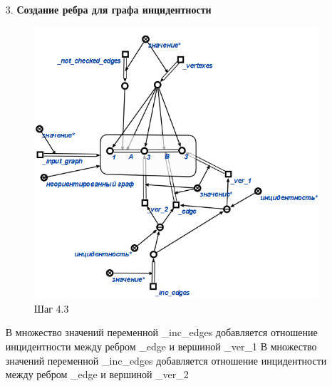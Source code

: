\begin{enumerate}
\begin{enumerate}
   \item[3.]
   \textbf{Создание ребра для графа инцидентности}
   \begin{figure}[H]
     \centering
     \includegraphics[scale=0.7]{algo/43.png}
     \caption{Шаг 4.3}
   \end{figure}
   В множество значений переменной \_inc\_edges добавляется отношение инцидентности между ребром \_edge и вершиной \_ver\_1
   В множество значений переменной \_inc\_edges добавляется отношение инцидентности между ребром \_edge и вершиной \_ver\_2
  \end{enumerate}


\end{enumerate}
